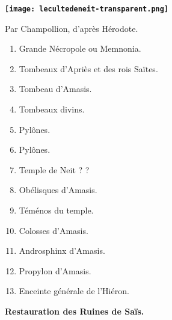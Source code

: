 \documentclass[a4paper, 11pt, oneside]{article}
\begin{document}
\begin{figure}[H]
\centering\bfseries
\texttt{[image: lecultedeneit-transparent.png]}
\caption{\bfseries\textbf{Restauration des Ruines de Saïs.}}
Par Champollion, d'après Hérodote.
\footnotesize
\centering
\begin{enumerate}
    \item Grande Nécropole ou Memnonia.
    \item Tombeaux d'Apriès et des rois Saïtes.
    \item Tombeau d'Amasis.
    \item Tombeaux divins.
    \item Pylônes.
    \item Pylônes.
    \item Temple de Neit ? ?
    \item Obélisques d'Amasis.
    \item Téménos du temple.
    \item Colosses d'Amasis.
    \item Androsphinx d'Amasis.
    \item Propylon d'Amasis.
    \item Enceinte générale de l'Hiéron.
\end{enumerate}
\end{figure}
\vspace*{\fill}
\clearpage
\ClearShipoutPictureBG
{}
\end{document}
